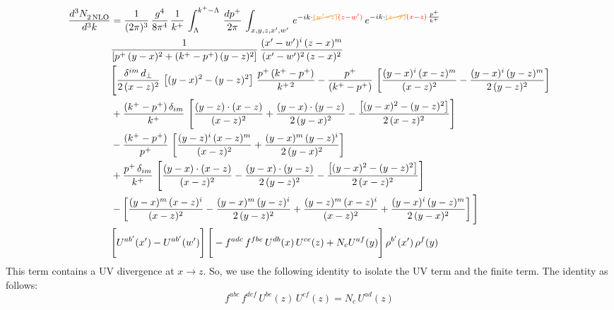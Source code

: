 \documentclass[9pt]{article}
\numberwithin{equation}{section}
\begin{document}
\begin{align}
    \frac{d^{3}N_{2\,\rm NLO}^{\rm}}{d^{3}k}  & =  \frac{1}{(2\pi)^{3}}\, \frac{g^{4}}{8\pi^{4}}\,\frac{1}{k^{+}}\,\int_{\Lambda}^{k^{+}-\Lambda}\, \frac{dp^{+}}{2\pi} \, \int_{x,y,z,x',w'}\,e^{-ik\cdot{\color{orange}\cancel{(w'-z)}}{\color{red}(z-w')}}\,e^{-ik\cdot {\color{orange}\cancel{(z-x)}}{\color{red}(x-z)}\,\frac{p^{+}}{k^{+}}}\,\notag \\ & \frac{1}{\left[p^{+}\,(y-x)^{2}+(k^{+}-p^{+})\,(y-z)^{2}\right]}\, \frac{(x'-w')^{i}\,(z-x)^{m}}{(x'-w')^{2}\,(z-x)^{2}} \notag \\ & \Bigg[\frac{\delta^{im}\,d_{\perp}}{2\,(x-z)^{2}}\,\left[(y-x)^{2}-(y-z)^{2}\right]\,\frac{p^{+}\,(k^{+}-p^{+})}{k^{+\,2}}-\frac{p^{+}}{(k^{+}-p^{+})}\,\left[\frac{(y-x)^{i}\,(x-z)^{m}}{(x-z)^{2}}-\frac{(y-x)^{i}\,(y-z)^{m}}{2\,(y-z)^{2}}\right]\notag \\ & +\frac{(k^{+}-p^{+})\,\delta_{im}}{k^{+}}\,\left[\frac{(y-z)\cdot (x-z)}{(x-z)^{2}}+\frac{(y-x)\cdot (y-z)}{2\,(y-x)^{2}}-\frac{\left[(y-x)^{2}-(y-z)^{2}\right]}{2\,(x-z)^{2}}\right]\notag \\ & -\frac{(k^{+}-p^{+})}{p^{+}}\,\left[\frac{(y-z)^{i}\,(x-z)^{m}}{(x-z)^{2}}+\frac{(y-x)^{m}\,(y-z)^{i}}{2\,(y-x)^{2}}\right]\notag \\ & +\frac{p^{+}\,\delta_{im}}{k^{+}}\,\left[\frac{(y-x)\cdot (x-z)}{(x-z)^{2}}-\frac{(y-x)\cdot (y-z)}{2\,(y-z)^{2}}-\frac{\left[(y-x)^{2}-(y-z)^{2}\right]}{2\,(x-z)^{2}}\right]\notag \\ &-\left[\frac{(y-x)^{m}\,(x-z)^{i}}{(x-z)^{2}}-\frac{(y-x)^{m}\,(y-z)^{i}}{2\,(y-z)^{2}}+\frac{(y-z)^{m}\,(x-z)^{i}}{(x-z)^{2}}+\frac{(y-x)^{i}\,(y-z)^{m}}{2\,(y-x)^{2}}\right]\Bigg] \notag \\ & \Bigg[U^{ab'}(x')-U^{ab'}(w')\Bigg]\,\Bigg[-f^{adc}\,f^{fbe}\,U^{db}(x)\,U^{ce}(z)+N_{c}U^{af}(y)\Bigg]\,\rho^{b'}(x')\,\rho^{f}(y)
\end{align}
This term contains a UV divergence at $x\rightarrow z$.  So, we use the following identity to isolate the UV term and the finite term. The identity as follows:
$$f^{abc}\,f^{def}\,U^{be}(z)\,U^{cf}(z) = N_{c}\,U^{ad}(z)$$
\end{document}
